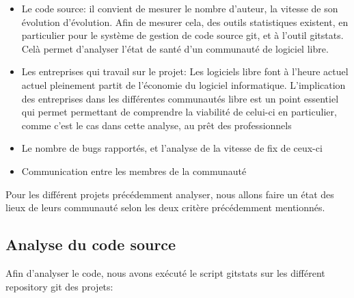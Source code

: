 \begin{itemize}

  \item {Le code source: il convient de mesurer le nombre d'auteur,
  la vitesse de son évolution
    d'évolution. Afin de mesurer cela, des outils statistiques
    existent, en particulier pour le système de gestion de code
    source git, et à l'outil gitstats. Celà permet
    d'analyser l'état de santé d'un communauté de logiciel libre.}

  \item {Les entreprises qui travail sur le projet: Les logiciels libre
    font à l'heure actuel actuel pleinement partit de l'économie
    du logiciel informatique. L'implication des entreprises dans les
    différentes communautés libre est un point essentiel qui permet
    permettant de comprendre la viabilité de celui-ci en particulier,
    comme c'est le cas dans cette analyse, au prêt des professionnels}

  \item {Le nombre de bugs rapportés, et l'analyse de la vitesse de fix
    de ceux-ci}

  \item {Communication entre les membres de la communauté}

\end{itemize}

Pour les différent projets précédemment analyser, nous allons
faire un état des lieux de leurs communauté selon les deux critère
précédemment mentionnés.

\subsection {Analyse du code source}

Afin d'analyser le code, nous avons exécuté le script gitstats sur
les différent repository git des projets:

